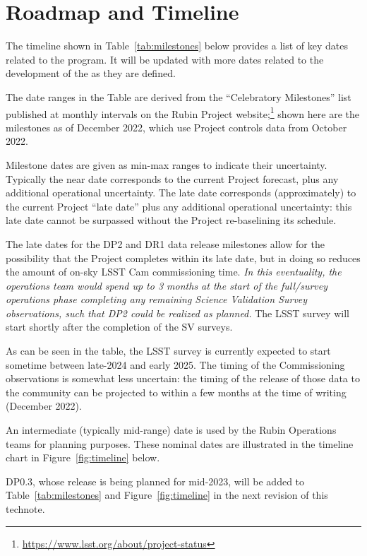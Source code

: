 \section{Roadmap and Timeline} \label{sec:timeline}

The timeline shown in Table~\ref{tab:milestones} below provides a list of key dates related to the \es program.
It will be updated with more dates related to the development of the \esp as they are defined.

The date ranges in the Table are derived from the ``Celebratory Milestones'' list published at monthly intervals on the Rubin Project website;\footnote{\url{https://www.lsst.org/about/project-status}} shown here are the milestones as of December 2022, which use Project controls data from October 2022.

Milestone dates are given as min-max ranges to indicate their uncertainty.
Typically the near date corresponds to the current Project forecast, plus any additional operational uncertainty.
The late date corresponds (approximately) to the current Project ``late date'' plus any additional operational uncertainty: this late date cannot be surpassed without the Project re-baselining its schedule.

The late dates for the DP2 and DR1 data release milestones allow for the possibility that the Project completes within its late date, but in doing so reduces the amount of on-sky LSST Cam commissioning time.
{\it In this eventuality, the operations team would spend up to 3 months at the start of the full/survey operations phase completing any remaining Science Validation Survey observations, such that DP2 could be realized as planned.}
The LSST survey will start shortly after the completion of the SV surveys.

As can be seen in the table, the LSST survey is currently expected to start sometime between late-2024 and early 2025.
The timing of the Commissioning observations is somewhat less uncertain: the timing of the release of those data to the community can be projected to within a few months at the time of writing (December 2022).

An intermediate (typically mid-range) date is used by the Rubin Operations teams for planning purposes. These nominal dates are illustrated in the timeline chart in Figure~\ref{fig:timeline} below.

DP0.3, whose release is being planned for mid-2023, will be added to Table~\ref{tab:milestones} and Figure~\ref{fig:timeline} in the next revision of this technote. 

